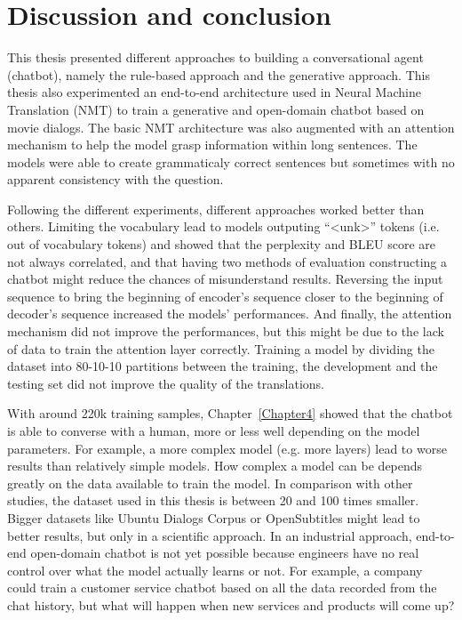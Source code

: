 
\chapter{Discussion and conclusion} %

\label{Chapter5} %

This thesis presented different approaches to building a conversational agent (chatbot), namely the rule-based approach and the generative approach. This thesis also experimented an end-to-end architecture used in Neural Machine Translation (NMT) to train a generative and open-domain chatbot based on movie dialogs.
The basic NMT architecture was also augmented with an attention mechanism to help the model grasp information within long sentences.
The models were able to create grammaticaly correct sentences but sometimes with no apparent consistency with the question.

Following the different experiments, different approaches worked better than others.
Limiting the vocabulary lead to models outputing ``<unk>'' tokens (i.e. out of vocabulary tokens) and showed that the perplexity and BLEU score are not always correlated, and that having two methods of evaluation constructing a chatbot might reduce the chances of misunderstand results.
Reversing the input sequence to bring the beginning of encoder's sequence closer to the beginning of decoder's sequence increased the models' performances.
And finally, the attention mechanism did not improve the performances, but this might be due to the lack of data to train the attention layer correctly.
Training a model by dividing the dataset into 80-10-10 partitions between the training, the development and the testing set did not improve the quality of the translations.

With around 220k training samples, Chapter~\ref{Chapter4} showed that the chatbot is able to converse with a human, more or less well depending on the model parameters. For example, a more complex model (e.g. more layers) lead to worse results than relatively simple models.
How complex a model can be depends greatly on the data available to train the model. In comparison with other studies, the dataset used in this thesis is between \num{20} \citep{DBLP:journals/corr/LowePSP15} and \num{100} \citep{1506.05869} times smaller.
Bigger datasets like Ubuntu Dialogs Corpus \citep{DBLP:journals/corr/LowePSP15} or OpenSubtitles \citep{open-subtitle} might lead to better results, but only in a scientific approach.
In an industrial approach, end-to-end open-domain chatbot is not yet possible because engineers have no real control over what the model actually learns or not.
For example, a company could train a customer service chatbot based on all the data recorded from the chat history, but what will happen when new services and products will come up?

